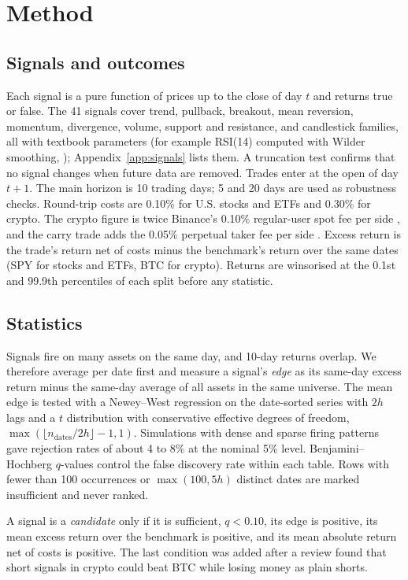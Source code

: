 \documentclass[11pt]{article}
\begin{document}
\section{Method}

\subsection{Signals and outcomes}
Each signal is a pure function of prices up to the close of day $t$ and returns true or false.
The 41 signals cover trend, pullback, breakout, mean reversion, momentum, divergence, volume,
support and resistance, and candlestick families, all with textbook parameters (for example
RSI(14) computed with Wilder smoothing, \citealp{wilder1978new}); Appendix~\ref{app:signals} lists
them. A truncation test confirms that no signal changes when future data are removed. Trades enter
at the open of day $t+1$. The main horizon is 10 trading days; 5 and 20 days are used as robustness
checks. Round-trip costs are 0.10\% for U.S. stocks and ETFs and 0.30\% for crypto. The crypto figure
is twice Binance's 0.10\% regular-user spot fee per side \citep{binance_spot_fees}, and the carry
trade adds the 0.05\% perpetual taker fee per side \citep{binance_futures_fees}. Excess return is the trade's return net of costs minus the
benchmark's return over the same dates (SPY for stocks and ETFs, BTC for crypto). Returns are
winsorised at the 0.1st and 99.9th percentiles of each split before any statistic.

\subsection{Statistics}
Signals fire on many assets on the same day, and 10-day returns overlap. We therefore average per
date first and measure a signal's \emph{edge} as its same-day excess return minus the same-day
average of all assets in the same universe. The mean edge is tested with a Newey--West regression
on the date-sorted series with $2h$ lags and a $t$ distribution with conservative effective degrees
of freedom, $\max(\lfloor n_{\text{dates}}/2h\rfloor-1,1)$. Simulations with dense and sparse firing
patterns gave rejection rates of about 4 to 8\% at the nominal 5\% level. Benjamini--Hochberg
$q$-values control the false discovery rate within each table. Rows with fewer than 100 occurrences
or $\max(100,5h)$ distinct dates are marked insufficient and never ranked.

A signal is a \emph{candidate} only if it is sufficient, $q<0.10$, its edge is positive, its mean
excess return over the benchmark is positive, and its mean absolute return net of costs is
positive. The last condition was added after a review found that short signals in crypto could beat
BTC while losing money as plain shorts.
\end{document}
